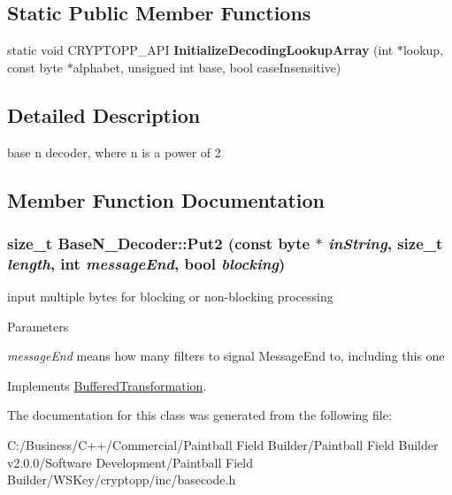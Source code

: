 \subsection*{Static Public Member Functions}
\begin{DoxyCompactItemize}
\item 
\hypertarget{class_base_n___decoder_a241a547cb292515c56908180b3071105}{
static void CRYPTOPP\_\-API {\bfseries InitializeDecodingLookupArray} (int $\ast$lookup, const byte $\ast$alphabet, unsigned int base, bool caseInsensitive)}
\label{class_base_n___decoder_a241a547cb292515c56908180b3071105}

\end{DoxyCompactItemize}


\subsection{Detailed Description}
base n decoder, where n is a power of 2 

\subsection{Member Function Documentation}
\hypertarget{class_base_n___decoder_a56c46bd846fca139874903d26df4385f}{
\subsubsection[{Put2}]{\setlength{\rightskip}{0pt plus 5cm}size\_\-t BaseN\_\-Decoder::Put2 (const byte $\ast$ {\em inString}, \/  size\_\-t {\em length}, \/  int {\em messageEnd}, \/  bool {\em blocking})}}
\label{class_base_n___decoder_a56c46bd846fca139874903d26df4385f}


input multiple bytes for blocking or non-\/blocking processing 
\begin{DoxyParams}{Parameters}
\item[{\em messageEnd}]means how many filters to signal MessageEnd to, including this one \end{DoxyParams}


Implements \hyperlink{class_buffered_transformation_ad396dcb42260f23125a35ec0e5d17d55}{BufferedTransformation}.

The documentation for this class was generated from the following file:\begin{DoxyCompactItemize}
\item 
C:/Business/C++/Commercial/Paintball Field Builder/Paintball Field Builder v2.0.0/Software Development/Paintball Field Builder/WSKey/cryptopp/inc/basecode.h\end{DoxyCompactItemize}
